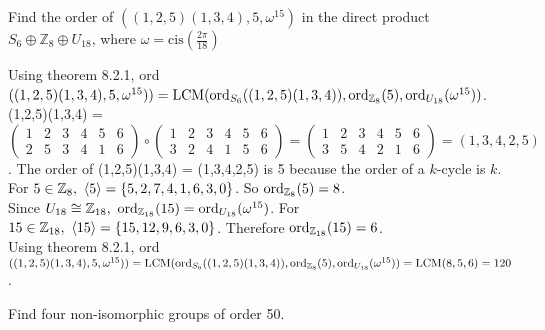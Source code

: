 \documentclass[titlepage]{article}
\begin{document}
\begin{problem}{6}
Find the order of $\left((1,2,5)(1,3,4),5,\omega^{15}\right)$ in the direct product $S_6 \oplus \mathbb{Z}_8 \oplus U_{18}$, where $\omega = \text{cis}(\frac{2\pi}{18})$
\end{problem}
\begin{solution}
Using theorem 8.2.1, ord$((1,2,5)(1,3,4),5,\omega^{15})) = \text{LCM}(\text{ord}_{S_6}((1,2,5)(1,3,4)),\text{ord}_{\mathbb{Z}_8}(5),\text{ord}_{U_{18}}(\omega^{15}))$.\\ (1,2,5)(1,3,4) =$\left(\begin{smallmatrix} 1 & 2 & 3 & 4 & 5 & 6 \\ 2 & 5 & 3 & 4 & 1 & 6 \end{smallmatrix}\right) \circ \left(\begin{smallmatrix}1 & 2 & 3 & 4 & 5 & 6 \\ 3 & 2 & 4 & 1 & 5 & 6 \end{smallmatrix}\right) = \left(\begin{smallmatrix}1 & 2 & 3  & 4 & 5 & 6 \\ 3 & 5 & 4 & 2 & 1 & 6 \end{smallmatrix}\right) = (1,3,4,2,5)$. The order of (1,2,5)(1,3,4) = (1,3,4,2,5) is 5 because the order of a $k$-cycle is $k$.
\\For $5 \in \mathbb{Z}_8, \ \langle 5 \rangle = \{5, 2, 7, 4, 1, 6, 3, 0\}$. So $\text{ord}_{\mathbb{Z}_8}(5) = 8$.
\\
Since $U_{18} \cong \Z_{18}, \ \text{ord}_{\Z_{18}}(15) = \text{ord}_{U_{18}}(\omega^{15})$. For $15 \in \mathbb{Z}_{18}, \ \langle 15 \rangle = \{15, 12, 9, 6, 3, 0\}$. Therefore $\text{ord}_{\mathbb{Z}_{18}}(15) = 6$.
\\
Using theorem 8.2.1, ord$((1,2,5)(1,3,4),5,\omega^{15})) = \text{LCM}(\text{ord}_{S_6}((1,2,5)(1,3,4)),\text{ord}_{\mathbb{Z}_8}(5),\text{ord}_{U_{18}}(\omega^{15})) = \text{LCM}(8,5,6) = 120$. 
\end{solution}
\begin{problem}{7}
Find four non-isomorphic groups of order 50.
\end{problem}
\end{document}
